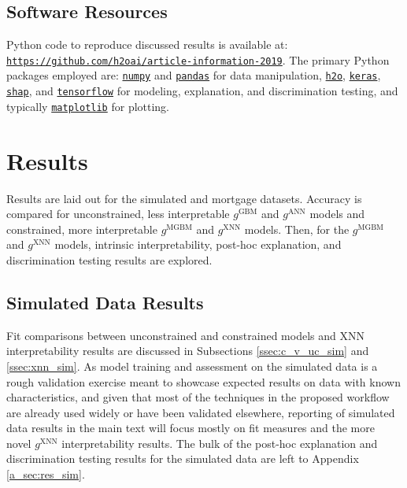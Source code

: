 \documentclass[information,article,submit,moreauthors,pdftex]{definitions/mdpi}
\begin{document}
\subsection{Software Resources}\label{ssec:soft}

Python code to reproduce discussed results is available at: \texttt{\url{https://github.com/h2oai/article-information-2019}}. The primary Python packages employed are: \href{https://numpy.org/}{\texttt{numpy}} and \href{https://pandas.pydata.org/}{\texttt{pandas}} for data manipulation, \href{https://github.com/h2oai/h2o-3}{\texttt{h2o}}, \href{https://keras.io/}{\texttt{keras}}, \href{https://github.com/slundberg/shap}{\texttt{shap}}, and \href{https://www.tensorflow.org/}{\texttt{tensorflow}} for modeling, explanation, and discrimination testing, and typically \href{https://matplotlib.org/}{\texttt{matplotlib}} for plotting. 

\section{Results}\label{sec:res}

Results are laid out for the simulated and mortgage datasets. Accuracy is compared for unconstrained, less interpretable $g^{\text{GBM}}$ and $g^{\text{ANN}}$ models and constrained, more interpretable $g^{\text{MGBM}}$ and $g^{\text{XNN}}$ models. Then, for the  $g^{\text{MGBM}}$ and $g^{\text{XNN}}$ models, intrinsic interpretability, post-hoc explanation, and discrimination testing results are explored.

\subsection{Simulated Data Results}

Fit comparisons between unconstrained and constrained models and XNN interpretability results are discussed in Subsections \ref{ssec:c_v_uc_sim} and \ref{ssec:xnn_sim}. As model training and assessment on the simulated data is a rough validation exercise meant to showcase expected results on data with known characteristics, and given that most of the techniques in the proposed workflow are already used widely or have been validated elsewhere, reporting of simulated data results in the main text will focus mostly on fit measures and the more novel $g^\text{XNN}$ interpretability results. The bulk of the post-hoc explanation and discrimination testing results for the simulated data are left to Appendix \ref{a_sec:res_sim}. 
\end{document}
